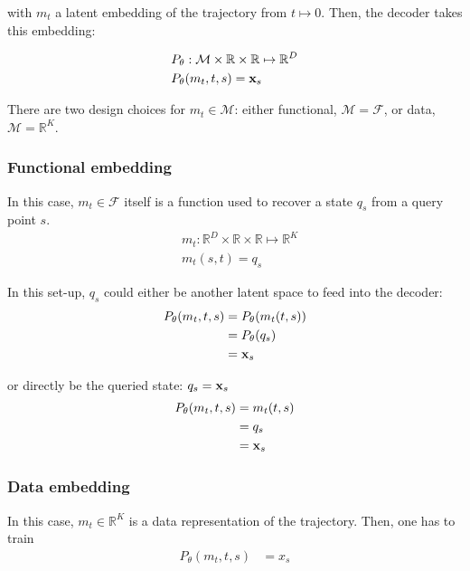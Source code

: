\noindent with $m_t$ a latent embedding of the trajectory from $t \mapsto 0$. Then, the decoder takes this embedding:

\begin{align*}
    & P_{\theta} : \mathcal{M} \times \mathbb{R} \times \mathbb{R} \mapsto \mathbb{R}^D \\
    & P_{\theta}(m_t, t, s) = \mathbf{x}_s
\end{align*}

\noindent There are two design choices for $m_t \in \mathcal{M}$: either functional, $\mathcal{M} = \mathcal{F}$, or data, $\mathcal{M} = \mathbb{R}^K$.

\subsubsection{Functional embedding}
In this case, $m_t \in \mathcal{F}$ itself is a function used to recover a state $q_s$ from a query point $s$.
\begin{align*}
    & m_t : \mathbb{R}^D \times \mathbb{R} \times \mathbb{R} \mapsto \mathbb{R}^K \\
    & m_t(s, t) = q_{s}
\end{align*}

\noindent In this set-up, $q_{s}$ could either be another latent space to feed into the decoder:
\begin{align*}
    P_{\theta}(m_t, t, s) & = P_{\theta}(m_t(t, s)) \\
                          & = P_{\theta}(q_s) \\
                          & = \mathbf{x}_s
\end{align*}

\noindent or directly be the queried state: $q_{s} = \mathbf{x}_s$
\begin{align*}
    P_{\theta}(m_t, t, s) & = m_t(t, s) \\
                          & = q_s \\
                          & = \mathbf{x}_s
\end{align*}

\subsubsection{Data embedding}
In this case, $m_t \in \mathbb{R}^K$ is a data representation of the trajectory. Then, one has to train
\begin{align*}
    P_{\theta}(m_t, t, s) & = x_s
\end{align*}

